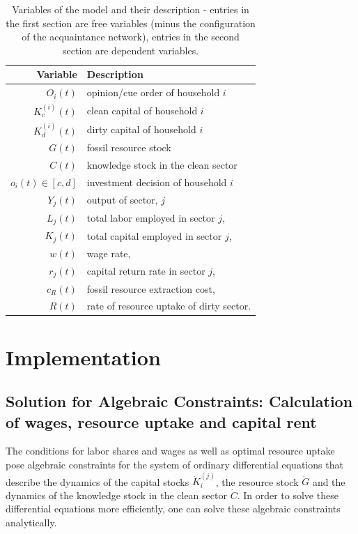 \begin{table}[t]
	\centering
	\begin{tabular}{r|l}
		Variable & Description \\\hline
		$O_i(t)$ & opinion/cue order of household $i$ \\
		$K^{(i)}_c(t)$ & clean capital of household $i$ \\
		$K^{(i)}_d(t)$ & dirty capital of household $i$ \\
		$G(t)$ & fossil resource stock \\
                $C(t)$ & knowledge stock in the clean sector \\\hline
		$o_i(t) \in [c,d]$ & investment decision of household $i$ \\
		$Y_j(t)$ & output of sector, $j$ \\
		$L_j(t)$ & total labor employed in sector $j$, \\
		$K_j(t)$ & total capital employed in sector $j$, \\
		$w(t)$   & wage rate, \\
		$r_j(t)$ & capital return rate in sector $j$, \\
		$c_R(t)$ & fossil resource extraction cost, \\
		$R(t)$ & rate of resource uptake of dirty sector. \\
	\end{tabular}
        \caption[Model variables with description]{Variables of the model and their description - entries in the first section are free variables (minus the configuration of the acquaintance network), entries in the second section are dependent variables.}
	\label{tab:derived_variables}
 \end{table}

\section{Implementation} 

\subsection{Solution for Algebraic Constraints: Calculation of wages, resource uptake and capital rent}
\label{sec:algebraic_constraints}

The conditions for labor shares and wages as well as optimal resource uptake pose algebraic constraints for the system of ordinary differential equations that describe the dynamics of the capital stocks $\dot{K}_i^{(j)}$, the resource stock $\dot{G}$ and the dynamics of the knowledge stock in the clean sector $\dot{C}$. In order to solve these differential equations more efficiently, one can solve these algebraic constraints analytically.

